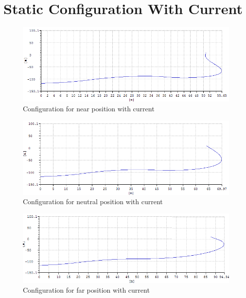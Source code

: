 \section{Static Configuration With Current}
\begin{figure}[H]
\centering
\includegraphics[scale=0.5]{figures/confignearc}
\caption[$\; \:$Configuration for near position with current]{Configuration for near position with current}
 \label{fig:confignear}
\end{figure}

\begin{figure}[H]
\centering
\includegraphics[scale=0.5]{figures/configneuc}
\caption[$\; \:$Configuration for neutral position with current]{Configuration for neutral position with current}
 \label{fig:configneu}
\end{figure}

\begin{figure}[H]
\centering
\includegraphics[scale=0.5]{figures/configfarc}
\caption[$\; \:$Configuration for far position with current]{Configuration for far position with current}
 \label{fig:configfar}
\end{figure}

